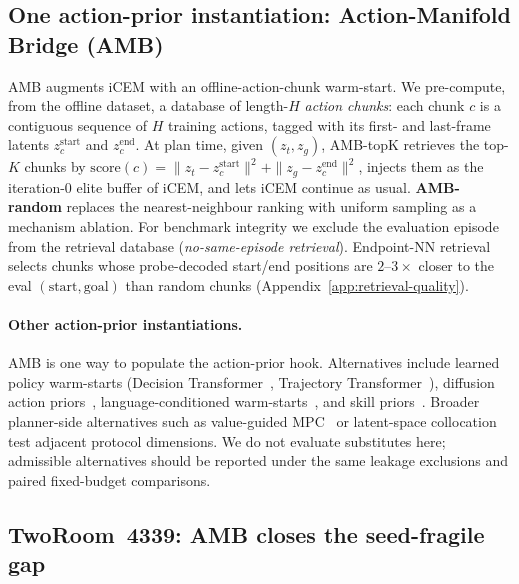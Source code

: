 \documentclass{article}
\begin{document}
\subsection{One action-prior instantiation: Action-Manifold Bridge (AMB)}

AMB augments iCEM with an offline-action-chunk warm-start. We pre-compute, from the offline dataset, a database of length-$H$ \emph{action chunks}: each chunk $c$ is a contiguous sequence of $H$ training actions, tagged with its first- and last-frame latents $z_c^{\text{start}}$ and $z_c^{\text{end}}$. At plan time, given $(z_t, z_g)$, AMB-topK retrieves the top-$K$ chunks by $\text{score}(c) = \|z_t - z_c^{\text{start}}\|^2 + \|z_g - z_c^{\text{end}}\|^2$, injects them as the iteration-0 elite buffer of iCEM, and lets iCEM continue as usual. \textbf{AMB-random} replaces the nearest-neighbour ranking with uniform sampling as a mechanism ablation. For benchmark integrity we exclude the evaluation episode from the retrieval database (\emph{no-same-episode retrieval}). Endpoint-NN retrieval selects chunks whose probe-decoded start/end positions are $2$--$3\times$ closer to the eval $(\text{start}, \text{goal})$ than random chunks (Appendix~\ref{app:retrieval-quality}).

\paragraph{Other action-prior instantiations.}
AMB is one way to populate the action-prior hook. Alternatives include learned policy warm-starts (Decision Transformer~\cite{chen2021decisiontransformer}, Trajectory Transformer~\cite{janner2021trajectorytransformer}), diffusion action priors~\cite{chi2025diffusionpolicy,janner2022diffuser}, language-conditioned warm-starts~\cite{nematollahi2025lumos,chahe2026pijepa}, and skill priors~\cite{guertler2025predictableskills}. Broader planner-side alternatives such as value-guided MPC~\cite{hansen2024tdmpc2} or latent-space collocation~\cite{rybkin2021latco} test adjacent protocol dimensions. We do not evaluate substitutes here; admissible alternatives should be reported under the same leakage exclusions and paired fixed-budget comparisons.

\subsection{TwoRoom~4339: AMB closes the seed-fragile gap}
\end{document}
